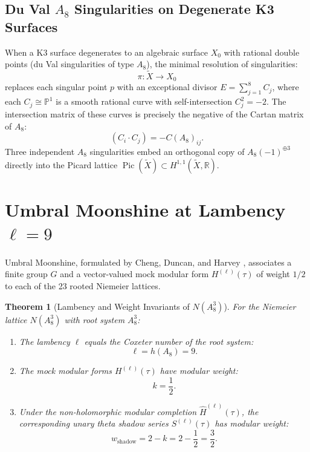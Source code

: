 \documentclass[11pt,a4paper]{article}
\newtheorem{theorem}{Theorem}
\begin{document}
\subsection{Du Val $A_8$ Singularities on Degenerate K3 Surfaces}
When a K3 surface degenerates to an algebraic surface $X_0$ with rational double points (du Val singularities of type $A_8$), the minimal resolution of singularities:
\begin{equation}
\pi: \widetilde{X} \to X_0
\end{equation}
replaces each singular point $p$ with an exceptional divisor $E = \sum_{j=1}^8 C_j$, where each $C_j \cong \mathbb{P}^1$ is a smooth rational curve with self-intersection $C_j^2 = -2$. The intersection matrix of these curves is precisely the negative of the Cartan matrix of $A_8$:
\begin{equation}
(C_i \cdot C_j) = - C(A_8)_{ij}.
\end{equation}
Three independent $A_8$ singularities embed an orthogonal copy of $A_8(-1)^{\oplus 3}$ directly into the Picard lattice $\operatorname{Pic}(\widetilde{X}) \subset H^{1,1}(\widetilde{X}, \mathbb{R})$.

\section{Umbral Moonshine at Lambency $\ell = 9$}

Umbral Moonshine, formulated by Cheng, Duncan, and Harvey \cite{cheng2014umbral}, associates a finite group $G$ and a vector-valued mock modular form $H^{(\ell)}(\tau)$ of weight $1/2$ to each of the 23 rooted Niemeier lattices.

\begin{theorem}[Lambency and Weight Invariants of $N(A_8^3)$]
For the Niemeier lattice $N(A_8^3)$ with root system $A_8^3$:
\begin{enumerate}
    \item The lambency $\ell$ equals the Coxeter number of the root system:
    \begin{equation}
    \ell = h(A_8) = 9.
    \end{equation}
    \item The mock modular forms $H^{(\ell)}(\tau)$ have modular weight:
    \begin{equation}
    k = \frac{1}{2}.
    \end{equation}
    \item Under the non-holomorphic modular completion $\widehat{H}^{(\ell)}(\tau)$, the corresponding unary theta shadow series $S^{(\ell)}(\tau)$ has modular weight:
    \begin{equation}
    w_{\text{shadow}} = 2 - k = 2 - \frac{1}{2} = \frac{3}{2}.
    \end{equation}
\end{enumerate}
\end{theorem}
\end{document}
